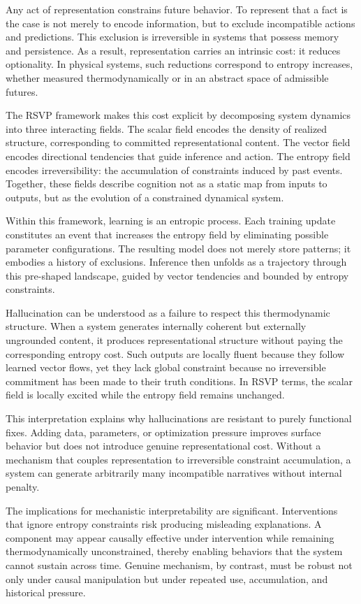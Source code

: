 \documentclass[11pt]{article}
\begin{document}
Any act of representation constrains future behavior. To represent that a fact
is the case is not merely to encode information, but to exclude incompatible
actions and predictions. This exclusion is irreversible in systems that possess
memory and persistence. As a result, representation carries an intrinsic cost:
it reduces optionality. In physical systems, such reductions correspond to
entropy increases, whether measured thermodynamically or in an abstract space
of admissible futures.

The RSVP framework makes this cost explicit by decomposing system dynamics into
three interacting fields. The scalar field encodes the density of realized
structure, corresponding to committed representational content. The vector
field encodes directional tendencies that guide inference and action. The
entropy field encodes irreversibility: the accumulation of constraints induced
by past events. Together, these fields describe cognition not as a static map
from inputs to outputs, but as the evolution of a constrained dynamical system.

Within this framework, learning is an entropic process. Each training update
constitutes an event that increases the entropy field by eliminating possible
parameter configurations. The resulting model does not merely store patterns;
it embodies a history of exclusions. Inference then unfolds as a trajectory
through this pre-shaped landscape, guided by vector tendencies and bounded by
entropy constraints.

Hallucination can be understood as a failure to respect this thermodynamic
structure. When a system generates internally coherent but externally ungrounded
content, it produces representational structure without paying the corresponding
entropy cost. Such outputs are locally fluent because they follow learned vector
flows, yet they lack global constraint because no irreversible commitment has
been made to their truth conditions. In RSVP terms, the scalar field is locally
excited while the entropy field remains unchanged.

This interpretation explains why hallucinations are resistant to purely
functional fixes. Adding data, parameters, or optimization pressure improves
surface behavior but does not introduce genuine representational cost. Without a
mechanism that couples representation to irreversible constraint accumulation,
a system can generate arbitrarily many incompatible narratives without internal
penalty.

The implications for mechanistic interpretability are significant. Interventions
that ignore entropy constraints risk producing misleading explanations. A
component may appear causally effective under intervention while remaining
thermodynamically unconstrained, thereby enabling behaviors that the system
cannot sustain across time. Genuine mechanism, by contrast, must be robust not
only under causal manipulation but under repeated use, accumulation, and
historical pressure.
\end{document}
